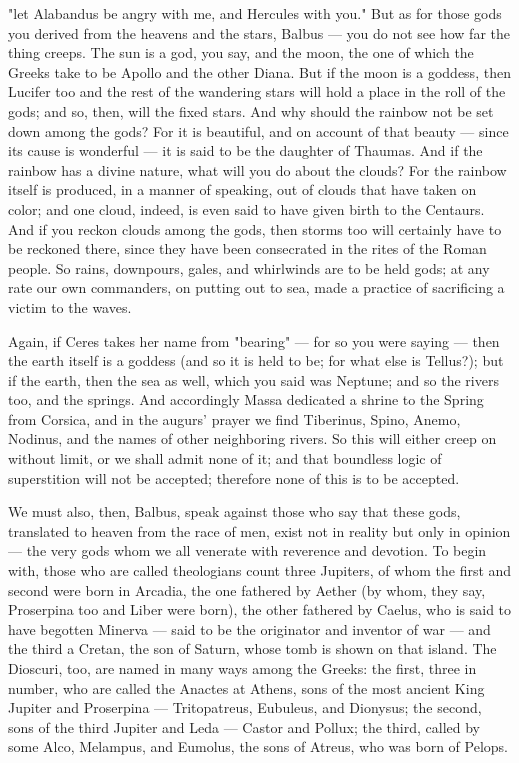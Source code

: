  "let Alabandus be angry with me, and Hercules with you." But as for those gods you derived from the heavens and the stars, Balbus — you do not see how far the thing creeps. The sun is a god, you say, and the moon, the one of which the Greeks take to be Apollo and the other Diana. But if the moon is a goddess, then Lucifer too and the rest of the wandering stars will hold a place in the roll of the gods; and so, then, will the fixed stars. And why should the rainbow not be set down among the gods? For it is beautiful, and on account of that beauty — since its cause is wonderful — it is said to be the daughter of Thaumas. And if the rainbow has a divine nature, what will you do about the clouds? For the rainbow itself is produced, in a manner of speaking, out of clouds that have taken on color; and one cloud, indeed, is even said to have given birth to the Centaurs. And if you reckon clouds among the gods, then storms too will certainly have to be reckoned there, since they have been consecrated in the rites of the Roman people. So rains, downpours, gales, and whirlwinds are to be held gods; at any rate our own commanders, on putting out to sea, made a practice of sacrificing a victim to the waves.

 Again, if Ceres takes her name from "bearing" — for so you were saying — then the earth itself is a goddess (and so it is held to be; for what else is Tellus?); but if the earth, then the sea as well, which you said was Neptune; and so the rivers too, and the springs. And accordingly Massa dedicated a shrine to the Spring from Corsica, and in the augurs' prayer we find Tiberinus, Spino, Anemo, Nodinus, and the names of other neighboring rivers. So this will either creep on without limit, or we shall admit none of it; and that boundless logic of superstition will not be accepted; therefore none of this is to be accepted.

 We must also, then, Balbus, speak against those who say that these gods, translated to heaven from the race of men, exist not in reality but only in opinion — the very gods whom we all venerate with reverence and devotion. To begin with, those who are called theologians count three Jupiters, of whom the first and second were born in Arcadia, the one fathered by Aether (by whom, they say, Proserpina too and Liber were born), the other fathered by Caelus, who is said to have begotten Minerva — said to be the originator and inventor of war — and the third a Cretan, the son of Saturn, whose tomb is shown on that island. The Dioscuri, too, are named in many ways among the Greeks: the first, three in number, who are called the Anactes at Athens, sons of the most ancient King Jupiter and Proserpina — Tritopatreus, Eubuleus, and Dionysus; the second, sons of the third Jupiter and Leda — Castor and Pollux; the third, called by some Alco, Melampus, and Eumolus, the sons of Atreus, who was born of Pelops.

